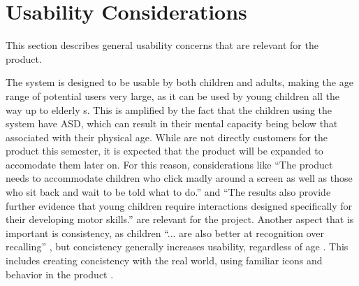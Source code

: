 \section{Usability Considerations}
\label{Preanalysis:Usability_for_children}
This section describes general usability concerns that are relevant for the product. \newline

The \giraf[] system is designed to be usable by both children and adults, making the age range of potential users very large, as it can be used by young children all the way up to elderly \guardian[]s. 
This is amplified by the fact that the children using the system have ASD, which can result in their mental capacity being below that associated with their physical age. \newline
While \autists[] are not directly customers for the product this semester, it is expected that the product will be expanded to accomodate them later on. 
For this reason, considerations like "`The product needs to accommodate children who click madly around a screen as well as those who sit back and wait to be told what to do."' \citep{microsoft:usability} and "`The results also provide further evidence that young children require interactions designed specifically for their developing motor skills."' \citep[p. 8]{mousesize} are relevant for the project. 
Another aspect that is important is consistency, as children "`... are also better at recognition over recalling"' \citep{microsoft:usability}, but concistency generally increases usability, regardless of age \citep[page 90]{dieb-book}. 
This includes creating concistency with the real world, using familiar icons and behavior in the product \citep{microsoft:usability}. 